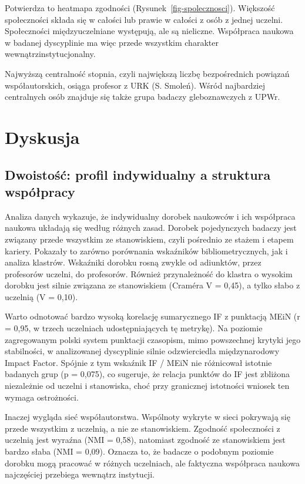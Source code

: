 \documentclass[
  polish,
  12pt,
  a4paper,
]{article}
\begin{document}
Potwierdza to heatmapa zgodności (Rysunek~\ref{fig-spolecznosci}).
Większość społeczności składa się w całości lub prawie w całości z osób
z jednej uczelni. Społeczności międzyuczelniane występują, ale są
nieliczne. Współpraca naukowa w badanej dyscyplinie ma więc przede
wszystkim charakter wewnątrzinstytucjonalny.

Najwyższą centralność stopnia, czyli największą liczbę bezpośrednich
powiązań współautorskich, osiąga profesor z URK (S. Smoleń). Wśród
najbardziej centralnych osób znajduje się także grupa badaczy
gleboznawczych z UPWr.

\section{Dyskusja}\label{dyskusja}

\subsection{Dwoistość: profil indywidualny a struktura
współpracy}\label{dwoistoux15bux107-profil-indywidualny-a-struktura-wspuxf3ux142pracy}

Analiza danych wykazuje, że indywidualny dorobek naukowców i ich
współpraca naukowa układają się według różnych zasad. Dorobek
pojedynczych badaczy jest związany przede wszystkim ze stanowiskiem,
czyli pośrednio ze stażem i etapem kariery. Pokazały to zarówno
porównania wskaźników bibliometrycznych, jak i analiza klastrów.
Wskaźniki dorobku rosną zwykle od adiunktów, przez profesorów uczelni,
do profesorów. Również przynależność do klastra o wysokim dorobku jest
silnie związana ze stanowiskiem (Craméra V = 0,45), a tylko słabo z
uczelnią (V = 0,10).

Warto odnotować bardzo wysoką korelację sumarycznego IF z punktacją MEiN
(r = 0,95, w trzech uczelniach udostępniających tę metrykę). Na poziomie
zagregowanym polski system punktacji czasopism, mimo powszechnej krytyki
jego stabilności, w analizowanej dyscyplinie silnie odzwierciedla
międzynarodowy Impact Factor. Spójnie z tym wskaźnik IF / MEiN nie
różnicował istotnie badanych grup (p = 0,075), co sugeruje, że relacja
punktów do IF jest zbliżona niezależnie od uczelni i stanowiska, choć
przy granicznej istotności wniosek ten wymaga ostrożności.

Inaczej wygląda sieć współautorstwa. Wspólnoty wykryte w sieci pokrywają
się przede wszystkim z uczelnią, a nie ze stanowiskiem. Zgodność
społeczności z uczelnią jest wyraźna (NMI = 0,58), natomiast zgodność ze
stanowiskiem jest bardzo słaba (NMI = 0,09). Oznacza to, że badacze o
podobnym poziomie dorobku mogą pracować w różnych uczelniach, ale
faktyczna współpraca naukowa najczęściej przebiega wewnątrz instytucji.
\end{document}

